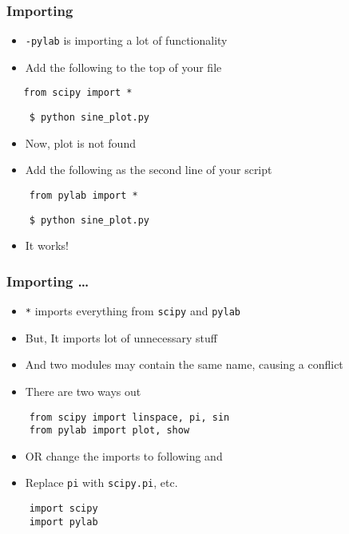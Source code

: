 \begin{frame}[fragile]
  \frametitle{Importing}
  \begin{itemize}
  \item \texttt{-pylab} is importing a lot of functionality
  \item Add the following to the top of your file
  \end{itemize}
  \begin{lstlisting}
   from scipy import *
  \end{lstlisting}
  \begin{lstlisting}
    $ python sine_plot.py
  \end{lstlisting} %
  \begin{itemize}
  \item Now, plot is not found
  \item Add the following as the second line of your script
  \end{itemize}
  \begin{lstlisting}
    from pylab import *
  \end{lstlisting}
  \begin{lstlisting}
    $ python sine_plot.py
  \end{lstlisting} %
  \begin{itemize}
  \item It works!
  \end{itemize}
\end{frame}

\begin{frame}[fragile]
  \frametitle{Importing \ldots}
  \begin{itemize}
  \item \texttt{*} imports everything from \texttt{scipy} and
    \texttt{pylab}
  \item But, It imports lot of unnecessary stuff
  \item And two modules may contain the same name, causing a conflict
  \item There are two ways out
  \end{itemize}
  \begin{lstlisting}
    from scipy import linspace, pi, sin
    from pylab import plot, show
  \end{lstlisting}
  \begin{itemize}
  \item OR change the imports to following and 
  \item Replace \texttt{pi} with \texttt{scipy.pi}, etc. 
  \end{itemize}
  \begin{lstlisting}
    import scipy
    import pylab
  \end{lstlisting}
\end{frame}


